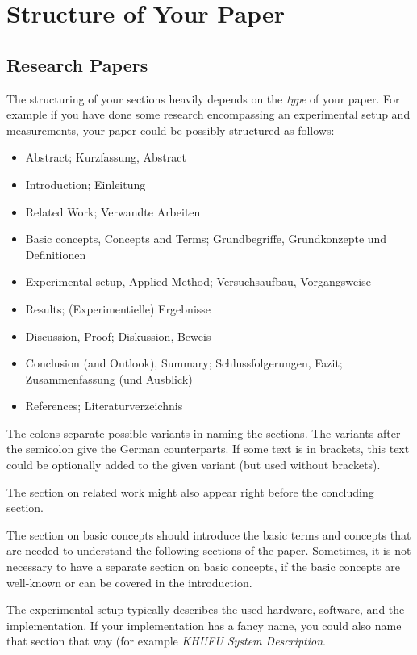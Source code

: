 \documentclass[10pt,a4paper,twoside,twocolumn]{article}
\begin{document}
\section{Structure of Your Paper\label{sec:structure}}

\subsection{Research Papers}

The structuring of your sections heavily depends on the \emph{type}
of your paper. For example if you have done some research
encompassing an experimental setup and measurements, your paper
could be possibly structured as follows:
\begin{itemize}
\item Abstract; Kurzfassung, Abstract
\item Introduction; Einleitung
\item Related Work; Verwandte Arbeiten
\item Basic concepts, Concepts and Terms; Grundbegriffe, Grundkonzepte und Definitionen
\item Experimental setup, Applied Method; Versuchsaufbau, Vorgangsweise
\item Results; (Experimentielle) Ergebnisse
\item Discussion, Proof; Diskussion, Beweis
\item Conclusion (and Outlook), Summary; Schlussfolgerungen, Fazit; Zusammenfassung (und Ausblick)
\item References; Literaturverzeichnis
\end{itemize}

The colons separate possible variants in naming the sections. The
variants after the semicolon give the German counterparts. If some
text is in brackets, this text could be optionally added to the
given variant (but used without brackets).

The section on related work might also appear right before the
concluding section.

The section on basic concepts should introduce the basic terms and
concepts that are needed to understand the following sections of the
paper. Sometimes, it is not necessary to have a separate section on
basic concepts, if the basic concepts are well-known or can be
covered in the introduction.

The experimental setup typically describes the used hardware,
software, and the implementation. If your implementation has a fancy
name, you could also name that section that way (for example
\emph{KHUFU System Description}.
\end{document}
